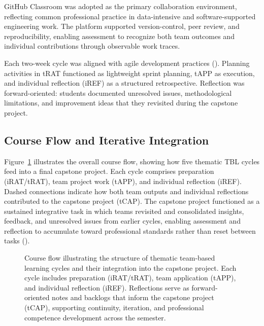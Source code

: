 GitHub Classroom was adopted as the primary collaboration environment, reflecting common professional practice in data-intensive and software-supported engineering work.
The platform supported version-control, peer review, and reproducibility, enabling assessment to recognize both team outcomes and individual contributions through observable work traces.

Each two-week cycle was aligned with agile development practices (\cite{schwaber2002agile}). Planning activities in tRAT functioned as lightweight sprint planning, tAPP as execution, and individual reflection (iREF) as a structured retrospective. Reflection was forward-oriented: students documented unresolved issues, methodological limitations, and improvement ideas that they revisited during the capstone project.

\subsection{Course Flow and Iterative Integration}

Figure~\ref{fig:course-flow} illustrates the overall course flow, showing how five thematic TBL cycles feed into a final capstone project. Each cycle comprises preparation (iRAT/tRAT), team project work (tAPP), and individual reflection (iREF). Dashed connections indicate how both team outputs and individual reflections contributed to the capstone project (tCAP). 
The capstone project functioned as a sustained integrative task in which teams revisited and consolidated insights, feedback, and unresolved issues from earlier cycles, enabling assessment and reflection to accumulate toward professional standards rather than reset between tasks (\cite{capstone}).


\begin{figure}[t]
  \centering
  
  \caption{Course flow illustrating the structure of thematic team-based learning cycles and their integration into the capstone project. Each cycle includes preparation (iRAT/tRAT), team application (tAPP), and individual reflection (iREF). Reflections serve as forward-oriented notes and backlogs that inform the capstone project (tCAP), supporting continuity, iteration, and professional competence development across the semester.}
  \label{fig:course-flow}
\end{figure}

